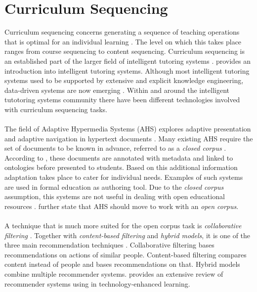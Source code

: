 \section{Curriculum Sequencing}
\label{sec:background_curriculum_sequencing}
Curriculum sequencing concerns generating a sequence of teaching operations
that is optimal for an individual learning \citep{Brusilovsky2003a}. The level
on which this takes place ranges from course sequencing to content sequencing.
Curriculum sequencing is an established part of the larger field of intelligent
tutoring systems \citep{Brusilovsky1996}. \citet{Vanlehn2006} provides an
introduction into intelligent tutoring systems. Although most intelligent
tutoring systems used to be supported by extensive and explicit knowledge
engineering, data-driven systems are now emerging \citep{Koedinger2013}. Within
and around the intelligent tutotoring systems community there have been
different technologies involved with curriculum sequencing tasks.\\\\
\noindent
The field of Adaptive Hypermedia Systems (AHS) explores adaptive presentation and
adaptive navigation in hypertext documents \citep{Brusilovsky2003b}. Many
existing AHS require the set of documents to be known in advance, referred to
as a \emph{closed corpus} \citep{Brusilovsky2007}. According to
\citeauthor{Brusilovsky2007}, these documents are annotated with metadata and
linked to ontologies before presented to students. Based on this additional
information adaptation takes place to cater for individual needs. Examples of
such systems \citep{Aerts2002, Kravcik2004} are used in formal education as
authoring tool. Due to the \emph{closed corpus} assumption, this systems are
not useful in dealing with open educational resources \citep{Brusilovsky2007}.
\citeauthor{Brusilovsky2007} further state that AHS should move to work with
an \emph{open corpus}.\\\\
\noindent
A technique that is much more suited for the open corpus task is
\emph{collaborative filtering} \citep{Manouselis2011}. Together with
\emph{content-based filtering} and \emph{hybrid models}, it is one of the three
main recommendation techniques \citep{Verbert2012}. Collaborative filtering
bases recommendations on actions of similar people. Content-based filtering
compares content instead of people and bases recommendations on that. Hybrid
models combine multiple recommender systems. \citep{Manouselis2011} provides an
extensive review of recommender systems using in technology-enhanced learning.
